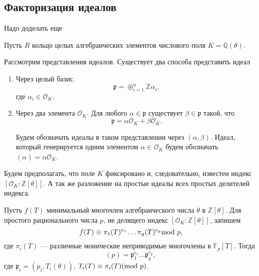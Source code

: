 \documentclass[_00_dissertation.tex]{subfiles}
\begin{document}
\subsection{Факторизация идеалов}

Надо доделать еще

Пусть $R$ кольцо целых алгебраических элементов числового поля $K = \mathbb{Q}(\theta)$.

Рассмотрим представления идеалов.
Существует два способа представить идеал

\begin{enumerate}
    \item Через целый базис.
    \begin{equation}\label{eq:Z_basis}
        \mathfrak{p} = \oplus_{i=1}^{n} \mathbb{Z}\alpha_i,
    \end{equation}
    где $\alpha_i\in\mathcal{O}_K$.

    \item Через два элемента $\mathcal{O}_K$.
    Для любого $\alpha\in\mathfrak{p}$ существует $\beta\in\mathfrak{p}$ такой, что
    \begin{equation}\label{eq:2_element}
        \mathfrak{p} = \alpha\mathcal{O}_K + \beta\mathcal{O}_K.
    \end{equation}

    Будем обозначать идеалы в таком представлении через $(\alpha, \beta)$.
    Идеал, который генерируется одним элементом $\alpha\in\mathcal{O}_K$ будем обозначать $(\alpha) = \alpha\mathcal{O}_K$.
\end{enumerate}

Будем предполагать, что поле $K$ фиксировано и, следовательно, известен индекс $[\mathcal{O}_K:\mathbb{Z}[\theta]]$.
А так же разложение на простые идеалы всех простых делителей индекса.

\begin{statement}\label{thm:dedekind}
    Пусть $f(T)$ минимальный многочлен алгебраического числа $\theta$ в $\mathbb{Z}[\theta]$.
    Для простого рационального числа $p$, не делящего индекс $[\mathcal{O}_K:\mathbb{Z}[\theta]]$, запишем
    \begin{equation}
        f(T) \equiv \pi_1(T)^{e_1}\dots \pi_g(T)^{e_g} \textrm{mod } p,\nonumber
    \end{equation}
    где $\pi_i(T)$ --- различные монические неприводимые многочлены в $\mathbb{F}_p[T]$.
    Тогда
    \begin{equation}
        (p) = \mathfrak{p}_1^{e_1}\dots \mathfrak{p}_g^{e_g},\nonumber
    \end{equation}
    где $\mathfrak{p}_i = (p_i, T_i(\theta))$, $T_i(T) \equiv \pi_i(T)(\textrm{mod } p)$.
\end{statement}
\end{document}
